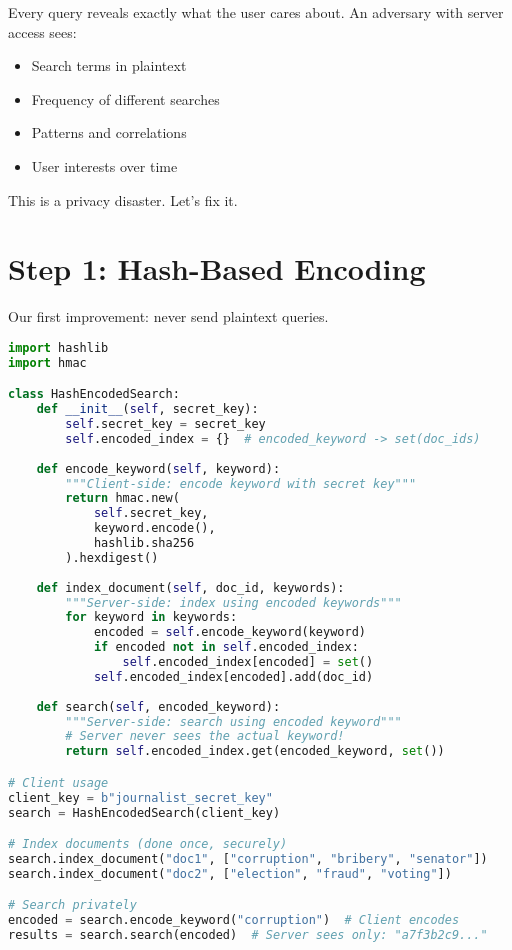 Every query reveals exactly what the user cares about. An adversary with server access sees:
\begin{itemize}
    \item Search terms in plaintext
    \item Frequency of different searches
    \item Patterns and correlations
    \item User interests over time
\end{itemize}

This is a privacy disaster. Let's fix it.

\section{Step 1: Hash-Based Encoding}

Our first improvement: never send plaintext queries.

\begin{lstlisting}[language=Python, caption=Hash encoding hides search terms]
import hashlib
import hmac

class HashEncodedSearch:
    def __init__(self, secret_key):
        self.secret_key = secret_key
        self.encoded_index = {}  # encoded_keyword -> set(doc_ids)
    
    def encode_keyword(self, keyword):
        """Client-side: encode keyword with secret key"""
        return hmac.new(
            self.secret_key,
            keyword.encode(),
            hashlib.sha256
        ).hexdigest()
    
    def index_document(self, doc_id, keywords):
        """Server-side: index using encoded keywords"""
        for keyword in keywords:
            encoded = self.encode_keyword(keyword)
            if encoded not in self.encoded_index:
                self.encoded_index[encoded] = set()
            self.encoded_index[encoded].add(doc_id)
    
    def search(self, encoded_keyword):
        """Server-side: search using encoded keyword"""
        # Server never sees the actual keyword!
        return self.encoded_index.get(encoded_keyword, set())

# Client usage
client_key = b"journalist_secret_key"
search = HashEncodedSearch(client_key)

# Index documents (done once, securely)
search.index_document("doc1", ["corruption", "bribery", "senator"])
search.index_document("doc2", ["election", "fraud", "voting"])

# Search privately
encoded = search.encode_keyword("corruption")  # Client encodes
results = search.search(encoded)  # Server sees only: "a7f3b2c9..."
\end{lstlisting}


